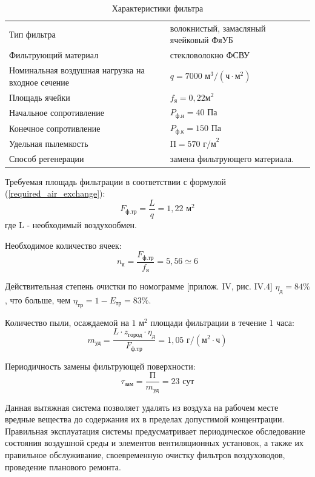 \begin{table}[ht]
    \centering
    \begin{tabular}{l|l}
        \hline
        Тип фильтра                                         & волокнистый, замасляный ячейковый ФяУБ            \\
        Фильтрующий материал                                & стекловолокно ФСВУ                                \\
        Номинальная воздушная нагрузка на входное сечение   & $q = 7000 \text{ м}^3/(\text{ч} \cdot \text{м}^2)$\\
        Площадь ячейки                                      & $f_\text{я} = 0,22 \text{м}^2 $                   \\
        Начальное сопротивление                             & $P_\text{ф.н} = 40 \text{ Па}$                    \\
        Конечное сопротивление                              & $P_\text{ф.к} = 150 \text{ Па}$                   \\
        Удельная пылемкость                                 & $\text{П} = 570 \text{ г/м}^2$                    \\
        Способ регенерации                                  & замена фильтрующего материала.                    \\
        \hline
    \end{tabular}
    \caption{Характеристики фильтра}
\end{table}

Требуемая площадь фильтрации в соответствии с формулой (\ref{required_air_exchange}):
$$
    F_\text{ф.тр} = \frac{L}{q} = 1,22 \text{ м}^2
$$
где L - необходимый воздухообмен.

Необходимое количество ячеек:
$$
    n_\text{я} =    \frac{F_\text{ф.тр}}{f_\text{я}} = 5,56
                    \simeq 6
$$

Действительная степень очистки по номограмме
\cite{air_ventilation_and_conditioning}[прилож. IV, рис. IV.4] $\eta_\text{д} = 84 \%$, что
больше, чем $\eta_\text{тр} = 1 - E_\text{тр} = 83 \%$.

Количество пыли, осаждаемой на $1 \text{ м}^2$ площади фильтрации в течение 1 часа:
$$
    m_\text{уд} = \frac{L \cdot z_\text{город} \cdot \eta_\text{д}}{F_\text{ф.тр}}
            = 1,05 \text{ г/}(\text{м}^2 \cdot \text{ч})
$$

Периодичность замены фильтрующей поверхности:
$$
    \tau_\text{зам} = \frac{\text{П}}{m_\text{уд}} = 23 \text{ сут}
$$

Данная вытяжная система позволяет удалять из воздуха на рабочем месте вредные
вещества до содержания их в пределах допустимой концентрации. Правильная эксплуатация
системы предусматривает периодическое обследование состояния воздушной среды и
элементов вентиляционных установок, а также их правильное обслуживание, своевременную
очистку фильтров воздуховодов, проведение планового ремонта.
